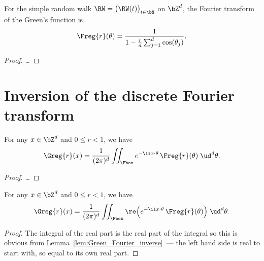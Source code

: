 \begin{lemma}
  \label{lem:SRW_Green_Fourier}
  For the simple random walk $\RW = \big(\RW(t)\big)_{t \in \bN}$ on $\bZ^d$,
  the Fourier transform of the Green's function is
  \begin{align*}
  \Freg{r} (\theta) = \frac{1}{1-\frac{r}{d} \sum_{j=1}^d \cos(\theta_j)} .
  \end{align*}
\end{lemma}
\begin{proof}
\ldots
\end{proof}

\section{Inversion of the discrete Fourier transform}

\begin{lemma}
  \label{lem:Green_Fourier_inverse}
  \leanok %
  For any $x \in \bZ^d$ and $0 \le r < 1$, we have
  \begin{align*}
  \Greg{r} (x)
  = \frac{1}{(2\pi)^d} \iint_{\Fbox} e^{-\ii x \cdot \theta} \, \Freg{r} (\theta) \; \ud^d \theta .
  \end{align*}
\end{lemma}
\begin{proof}
\ldots
\end{proof}

\begin{lemma}
  \label{lem:Green_Fourier_inverse_real}
  \leanok %
  For any $x \in \bZ^d$ and $0 \le r < 1$, we have
  \begin{align*}
  \Greg{r} (x)
  = \frac{1}{(2\pi)^d} \iint_{\Fbox} \re \Big( e^{-\ii x \cdot \theta} \, \Freg{r} (\theta) \Big) \; \ud^d \theta .
  \end{align*}
\end{lemma}
\begin{proof}
  \leanok %
  The integral of the real part is the real part of the integral
  so this is obvious from Lemma~\ref{lem:Green_Fourier_inverse}~---
  the left hand side is real to start with, so equal to its own real part.
\end{proof}

